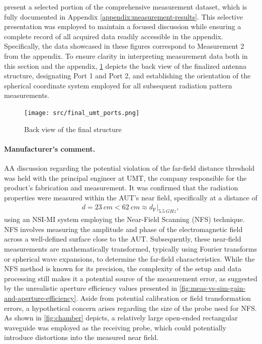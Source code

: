 \documentclass[11pt,a4paper,twoside,openany]{report}
\begin{document}
 present a selected portion of the comprehensive measurement dataset, which is fully documented in Appendix \ref{appendix:measurement-results}. This selective presentation was employed to maintain a focused discussion while ensuring a complete record of all acquired data readily accessible in the appendix. Specifically, the data showcased in these figures correspond to Measurement 2 from the appendix. To ensure clarity in interpreting measurement data both in this section and the appendix, \cref{fig:final-ports} depicts the back view of the finalized antenna structure, designating Port 1 and Port 2, and establishing the orientation of the spherical coordinate system employed for all subsequent radiation pattern measurements.
\begin{figure}[!ht]
    \centering
    \texttt{[image: src/final\_umt\_ports.png]}
    \caption{\label{fig:final-ports}Back view of the final structure}
\end{figure}

\paragraph{Manufacturer's comment.} AA discussion regarding the potential violation of the far-field distance threshold was held with the principal engineer at UMT, the company responsible for the product's fabrication and measurement. It was confirmed that the radiation properties were measured within the AUT's near field, specifically at a distance of
\begin{align}
    d = \qty{23}{cm} < \qty{62}{cm} \approx d_{\mathrm{F}}\Big|_{\qty{5.5}{GHz}},
\end{align}
using an NSI-MI system employing the Near-Field Scanning (NFS) technique. NFS involves measuring the amplitude and phase of the electromagnetic field across a well-defined surface close to the AUT. Subsequently, these near-field measurements are mathematically transformed, typically using Fourier transforms or spherical wave expansions, to determine the far-field characteristics. While the NFS method is known for its precision, the complexity of the setup and data processing still makes it a potential source of the measurement error, as suggested by the unrealistic aperture efficiency values presented in \cref{fig:meas-vs-sim-gain-and-aperture-efficiency}. Aside from potential calibration or field transformation errors, a hypothetical concern arises regarding the size of the probe used for NFS. As shown in \cref{fig:chamber} depicts, a relatively large open-ended rectangular waveguide was employed as the receiving probe, which could potentially introduce distortions into the measured near field.
\end{document}
